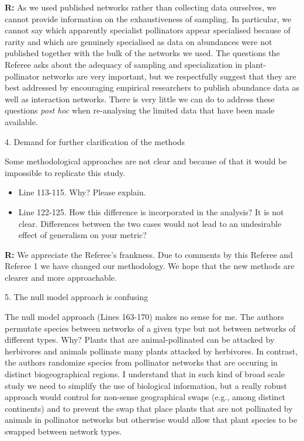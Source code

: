 \documentclass[12pt]{letter}
\newenvironment{refquote}{\bigskip \begin{it}}{\end{it}\smallskip}
\begin{document}
    \textbf{R:} As we used published networks rather than collecting data ourselves, we cannot provide information on the exhaustiveness of sampling. In particular, we cannot say which apparently specialist pollinators appear specialised because of rarity and which are genuinely specialised as data on abundances were not published together with the bulk of the networks we used. The questions the Referee asks about the adequacy of sampling and specialization in plant-pollinator networks are very important, but we respectfully suggest that they are best addressed by encouraging empirical researchers to publish abundance data as well as interaction networks. There is very little we can do to address these questions \emph{post hoc} when re-analysing the limited data that have been made available.


 4. Demand for further clarification of the methods

    \begin{refquote}

      Some methodological approaches are not clear and because of that it would be impossible to replicate this study.

        \begin{itemize}
          \item Line 113-115. Why? Please explain.
          \item Line 122-125. How this difference is incorporated in the analysis? It is not clear. Differences between the two cases would not lead to an undesirable effect of generalism on your metric?
        \end{itemize}

      \end{refquote}

      \textbf{R:} We appreciate the Referee's frankness. Due to comments by this Referee and Referee 1 we have changed our methodology. We hope that the new methods are clearer and more approachable.


  5. The null model approach is confusing

    \begin{refquote} 

      The null model approach (Lines 163-170) makes no sense for me. The authors permutate species between networks of a given type but not between networks of different types. Why? Plants that are animal-pollinated can be attacked by herbivores and animals pollinate many plants attacked by herbivores. In contrast, the authors randomize species from pollinator networks that are occuring in distinct biogeographical regions. I understand that in such kind of broad scale study we need to simplify the use of biological information, but a really robust approach would control for non-sense geographical swaps (e.g., among distinct continents) and to prevent the swap that place plants that are not pollinated by animals in pollinator networks but otherwise would allow that plant species to be swapped between network types.

      \end{refquote}
\end{document}
